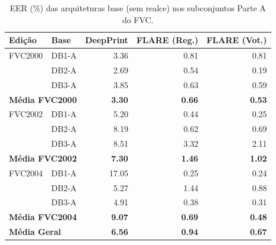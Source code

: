 
\begin{table}[htbp]
\centering
\small
\caption{EER (\%) das arquiteturas base (sem realce) nos subconjuntos Parte A do FVC.}\label{tab:eer_base}
\setlength{\tabcolsep}{8pt}
\begin{tabular}{ll rrr}
\toprule
\textbf{Edição} & \textbf{Base} & \textbf{DeepPrint} & \textbf{FLARE (Reg.)} & \textbf{FLARE (Vot.)} \\
\midrule
FVC2000 & DB1-A & 3.36 & 0.81 & 0.81 \\
 & DB2-A & 2.69 & 0.54 & 0.19 \\
 & DB3-A & 3.85 & 0.63 & 0.59 \\
\cmidrule{2-5}
\multicolumn{2}{l}{\textbf{Média FVC2000}} & \textbf{3.30} & \textbf{0.66} & \textbf{0.53} \\
\midrule
FVC2002 & DB1-A & 5.20 & 0.44 & 0.25 \\
 & DB2-A & 8.19 & 0.62 & 0.69 \\
 & DB3-A & 8.51 & 3.32 & 2.11 \\
\cmidrule{2-5}
\multicolumn{2}{l}{\textbf{Média FVC2002}} & \textbf{7.30} & \textbf{1.46} & \textbf{1.02} \\
\midrule
FVC2004 & DB1-A & 17.05 & 0.25 & 0.24 \\
 & DB2-A & 5.27 & 1.44 & 0.88 \\
 & DB3-A & 4.91 & 0.38 & 0.31 \\
\cmidrule{2-5}
\multicolumn{2}{l}{\textbf{Média FVC2004}} & \textbf{9.07} & \textbf{0.69} & \textbf{0.48} \\
\midrule[\heavyrulewidth]
\multicolumn{2}{l}{\textbf{Média Geral}} & \textbf{6.56} & \textbf{0.94} & \textbf{0.67} \\
\bottomrule
\end{tabular}
\end{table}

